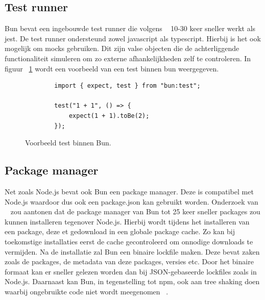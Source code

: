 \subsection{Test runner}
Bun bevat een ingebouwde test runner die volgens ~\textcite{McDonnel2023} 10-30 keer sneller werkt als jest.
De test runner ondersteund zowel javascript als typescript. Hierbij is het ook mogelijk om mocks gebruiken.
Dit zijn valse objecten die de achterliggende functionaliteit simuleren om zo externe afhankelijkheden zelf te controleren.
In figuur ~\ref{fig:testbun} wordt een voorbeeld van een test binnen bun weergegeven.
\begin{figure}[H]
    \centering
    \begin{verbatim}
        import { expect, test } from "bun:test";

        test("1 + 1", () => {
            expect(1 + 1).toBe(2);
        });
        \end{verbatim}
        \caption{\label{fig:testbun}}Voorbeeld test binnen Bun.
\end{figure}

\subsection{Package manager}
Net zoals Node.js bevat ook Bun een package manager. 
Deze is compatibel met Node.js waardoor dus ook een package.json kan gebruikt worden.
Onderzoek van ~\textcite{McDonnel2023} zou aantonen dat de package manager 
van Bun tot 25 keer sneller packages zou kunnen installeren tegenover Node.js.
Hierbij wordt tijdens het installeren van een package, 
deze et gedownload in een globale package cache. Zo kan bij toekomstige installaties 
eerst de cache gecontroleerd om onnodige downloads te vermijden. Na de installatie zal Bun een binaire lockfile maken. 
Deze bevat zaken zoals de packages, de metadata van deze packages, versies etc. Door het binaire formaat kan er sneller gelezen worden dan bij JSON-gebaseerde lockfiles zoals in Node.js.
Daarnaast kan Bun, in tegenstelling tot npm, ook aan tree shaking doen waarbij ongebruikte code niet wordt meegenomen ~\autocite{Aghdasi2023}.



